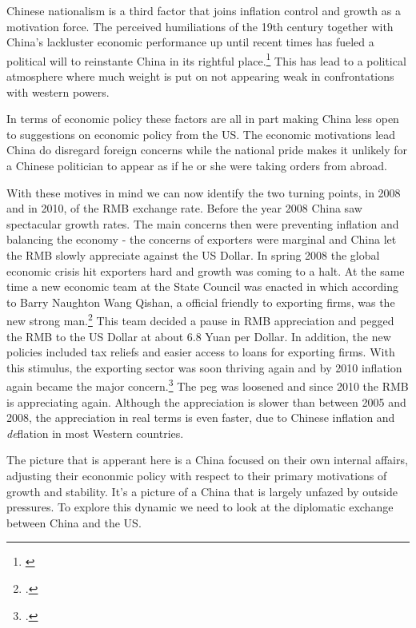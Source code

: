 Chinese nationalism is a third factor that joins inflation control and 
growth as a motivation force. The perceived humiliations of the 19th 
century together with China's lackluster economic performance up until 
recent times has fueled a political will to reinstante China in its 
rightful place.\footnote{\cite{hughes2006}} This has lead to a political 
atmosphere where much weight is put on not appearing weak in 
confrontations with western powers.

In terms of economic policy these factors are all in part making China
less open to suggestions on economic policy from the US. The economic 
motivations lead China do disregard foreign concerns while the national 
pride makes it unlikely for a Chinese politician to appear as if he or 
she were taking orders from abroad.  

With these motives in mind we can now identify the two turning points, 
in 2008 and in 2010, of the RMB exchange rate. Before the year 2008 
China saw spectacular growth rates.  The main concerns then were 
preventing inflation and balancing the economy - the concerns of 
exporters were marginal and China let the RMB slowly appreciate against 
the US Dollar. In spring 2008 the global economic crisis hit exporters 
hard and growth was coming to a halt. At the same time a new economic 
team at the State Council was enacted in which according to Barry 
Naughton Wang Qishan, a official friendly to exporting firms, was the 
new strong man.\footnote{\cite{Naughton2008}.} This team decided a pause 
in RMB appreciation and pegged the RMB to the US Dollar at about 6.8 
Yuan per Dollar. In addition, the new policies included tax reliefs and 
easier access to loans for exporting firms. With this stimulus, the 
exporting sector was soon thriving again and by 2010 inflation again 
became the major concern.\footnote{\cite{Naughton2010}.} The peg was 
loosened and since 2010 the RMB is appreciating again. Although the 
appreciation is slower than between 2005 and 2008, the appreciation in 
real terms is even faster, due to Chinese inflation and \emph{de}flation 
in most Western countries.

The picture that is apperant here is a China focused on their own 
internal affairs, adjusting their econonmic policy with respect to their 
primary motivations of growth and stability. It's a picture of a China 
that is largely unfazed by outside pressures. To explore this dynamic we 
need to look at the diplomatic exchange between China and the US.

